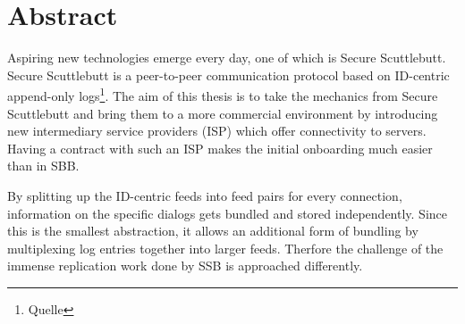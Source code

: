 \chapter{Abstract}
Aspiring new technologies emerge every day, one of which is Secure Scuttlebutt. Secure Scuttlebutt is a peer-to-peer communication protocol based on ID-centric append-only logs\footnote{Quelle}. The aim of this thesis is to take the mechanics from Secure Scuttlebutt and bring them to a more commercial environment by introducing new intermediary service providers (ISP) which offer connectivity to servers. Having a contract with such an ISP makes the initial onboarding much easier than in SBB. 

By splitting up the ID-centric feeds into feed pairs for every connection, information on the specific dialogs gets bundled and stored independently. Since this is the smallest abstraction, it allows an additional form of bundling by multiplexing log entries together  into larger feeds. Therfore the challenge of the immense replication work done by SSB is approached differently. 
